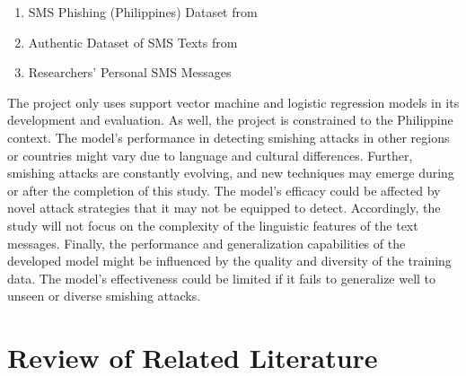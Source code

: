 \documentclass[conference]{IEEEtran}
\begin{document}
\begin{enumerate}
    \item SMS Phishing (Philippines) Dataset from \cite{bwandowando2023}
    \item Authentic Dataset of SMS Texts from \cite{mishra2022}
    \item Researchers' Personal SMS Messages
\end{enumerate}

The project only uses support vector machine and logistic regression models in its development and evaluation. As well, the project is constrained to the Philippine context. The model's performance in detecting smishing attacks in other regions or countries might vary due to language and cultural differences. Further, smishing attacks are constantly evolving, and new techniques may emerge during or after the completion of this study. The model's efficacy could be affected by novel attack strategies that it may not be equipped to detect. Accordingly, the study will not focus on the complexity of the linguistic features of the text messages. Finally, the performance and generalization capabilities of the developed model might be influenced by the quality and diversity of the training data. The model's effectiveness could be limited if it fails to generalize well to unseen or diverse smishing attacks.

\section{Review of Related Literature}


\end{document}
